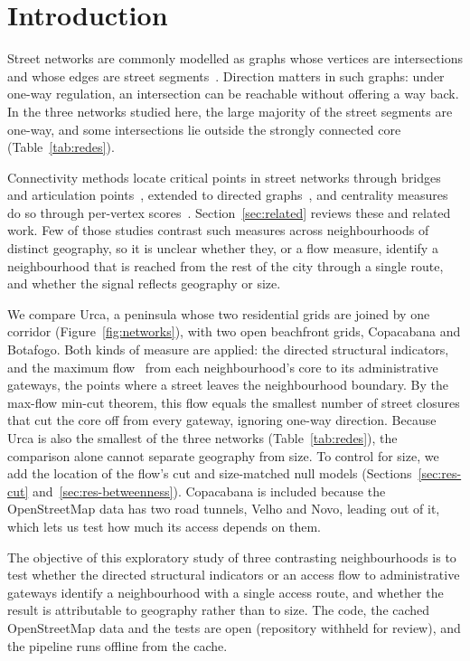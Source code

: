 \documentclass[runningheads]{llncs}
\begin{document}
\section{Introduction}
\label{sec:intro}

Street networks are commonly modelled as graphs whose vertices are
intersections and whose edges are street segments~\cite{boeing}. Direction
matters in such graphs: under one-way regulation, an intersection can be
reachable without offering a way back. In the three networks studied here,
the large majority of the street segments are one-way, and some
intersections lie outside the strongly connected core
(Table~\ref{tab:redes}).

Connectivity methods locate critical points in street networks through
bridges and articulation points~\cite{tarjan1972depth}, extended to directed
graphs~\cite{italiano2012finding}, and centrality measures do so through
per-vertex scores~\cite{alatristasalas2019,bhamidipati2024}.
Section~\ref{sec:related} reviews these and related work. Few of those
studies contrast such measures across neighbourhoods of distinct geography,
so it is unclear whether they, or a flow measure, identify a neighbourhood
that is reached from the rest of the city through a single route, and whether
the signal reflects geography or size.

We compare Urca, a peninsula whose two residential grids are joined by one
corridor (Figure~\ref{fig:networks}), with two open beachfront grids,
Copacabana and Botafogo. Both kinds of measure are applied: the directed
structural indicators, and the maximum flow~\cite{edmonds1972theoretical} from each
neighbourhood's core to its administrative gateways, the points where a street leaves the
neighbourhood boundary. By the max-flow min-cut theorem, this flow equals the
smallest number of street closures that cut the core off from every gateway,
ignoring one-way direction. Because Urca is also the smallest of the three
networks (Table~\ref{tab:redes}), the comparison alone cannot separate
geography from size. To control for size, we add the
location of the flow's cut and size-matched null models
(Sections~\ref{sec:res-cut} and~\ref{sec:res-betweenness}). Copacabana is
included because the OpenStreetMap data has two road tunnels, Velho and
Novo, leading out of it, which lets us test how much its access depends on
them.

The objective of this exploratory study of three contrasting neighbourhoods is 
to test whether the directed structural indicators or an access flow to 
administrative gateways identify a neighbourhood with a single access route, 
and whether the result is attributable to geography rather than to size. 
The code, the cached OpenStreetMap data and the tests are open (repository withheld for review), 
and the pipeline runs offline from the cache.
\end{document}
